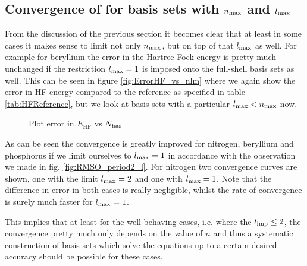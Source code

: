 
\subsection{Convergence of \HF for \CS basis sets with $n_\text{max}$ and $l_\text{max}$}
From the discussion of the previous section
it becomes clear that at least in some cases it makes sense to
limit not only $n_\text{max}$, but on top of that $l_\text{max}$ as well.
For example for beryllium the error
in the Hartree-Fock energy is pretty much unchanged if the
restriction $l_\text{max} = 1$ is imposed onto the full-shell \CS basis sets as well.
This can be seen in figure \vref{fig:ErrorHF_vs_nlm}
where we again show the error in HF energy compared to the reference
as specified in table \vref{tab:HFReference},
but we look at basis sets with a particular $l_\text{max} < n_\text{max}$ now.

\begin{figure}
	\centering
	\caption{Plot error in $E_\text{HF}$ vs $N_\text{bas}$}
	\label{fig:ErrorHF_vs_nlm}
\end{figure}

As can be seen the convergence is greatly improved
for nitrogen, beryllium and phosphorus
if we limit ourselves to $l_\text{max} = 1$
in accordance with the observation we made in fig.
\vref{fig:RMSO_period2_l}.
For nitrogen two convergence curves are shown,
one with the limit $l_\text{max} = 2$ and one with $l_\text{max} = 1$.
Note that the difference in \HF error in both cases
is really negligible, whilst the rate of convergence is
surely much faster for $l_\text{max} = 1$.

\defineabbr{AM}{AM\xspace}{angular momentum}
This implies that at least for the well-behaving cases,
i.e. where the $l_\text{imp} \le 2$,
the convergence pretty much only depends on the value
of $n$ and thus a systematic construction of basis
sets which solve the \HF equations up to a certain
desired accuracy should be possible for these cases.

